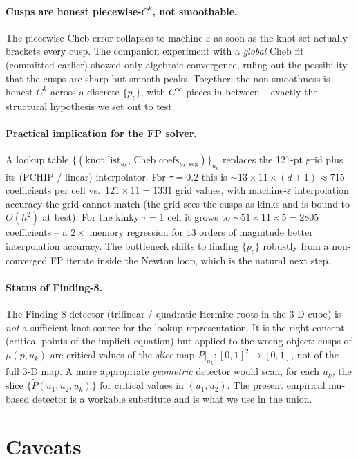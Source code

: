 \documentclass[11pt,a4paper]{article}
\begin{document}
\paragraph{Cusps are honest piecewise-$C^k$, not smoothable.}
The piecewise-Cheb error collapses to machine $\varepsilon$ as soon as the
knot set actually brackets every cusp. The companion experiment with a
\emph{global} Cheb fit (committed earlier) showed only algebraic
convergence, ruling out the possibility that the cusps are sharp-but-smooth
peaks. Together: the non-smoothness is honest $C^k$ across a discrete
$\{p_c\}$, with $C^\infty$ pieces in between -- exactly the structural
hypothesis we set out to test.

\paragraph{Practical implication for the FP solver.} A lookup table
$\{(\text{knot list}_{u_k},\,\text{Cheb coefs}_{u_k,\mathrm{seg}})\}_{u_k}$
replaces the 121-pt grid plus its (PCHIP / linear) interpolator. For
$\tau{=}0.2$ this is $\sim 13\!\times\!11\!\times\!(d{+}1) \approx 715$
coefficients per cell vs.\ $121\!\times\!11 = 1331$ grid values, with
machine-$\varepsilon$ interpolation accuracy the grid cannot match (the
grid sees the cusps as kinks and is bound to $O(h^2)$ at best). For the
kinky $\tau{=}1$ cell it grows to $\sim 51\!\times\!11\!\times\!5 = 2805$
coefficients -- a $2\times$ memory regression for $13$ orders of magnitude
better interpolation accuracy. The bottleneck shifts to finding $\{p_c\}$
robustly from a non-converged FP iterate inside the Newton loop, which is
the natural next step.

\paragraph{Status of Finding-8.} The Finding-8 detector (trilinear /
quadratic Hermite roots in the 3-D cube) is \emph{not} a sufficient knot
source for the lookup representation. It is the right concept (critical
points of the implicit equation) but applied to the wrong object: cusps of
$\mu(p,u_k)$ are critical values of the \emph{slice} map
$\tilde P\big|_{u_k}: [0,1]^2\to[0,1]$, not of the full 3-D map. A more
appropriate \emph{geometric} detector would scan, for each $u_k$, the
slice $\{\tilde P(u_1,u_2,u_k)\}$ for critical values in $(u_1,u_2)$. The
present empirical mu-based detector is a workable substitute and is what
we use in the union.

\section{Caveats}
\end{document}
